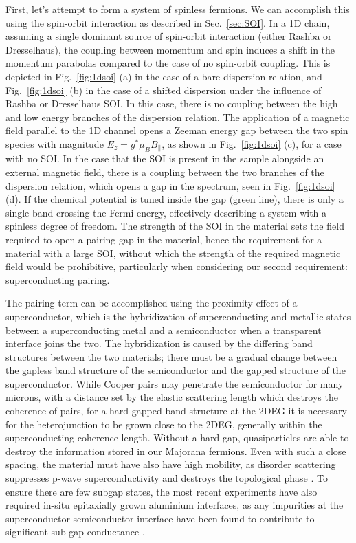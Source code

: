 First, let's attempt to form a system of spinless fermions. We can accomplish this using the spin-orbit interaction as described in
Sec.~\ref{sec:SOI}. In a 1D chain, assuming a single dominant source of spin-orbit interaction (either Rashba or Dresselhaus), the coupling between momentum
and spin induces a shift in the momentum parabolas compared to the case of no spin-orbit coupling. This is depicted in Fig.~\ref{fig:1dsoi} (a) in the case of a bare
dispersion relation, and Fig.~\ref{fig:1dsoi} (b) in the case of a shifted dispersion under the influence of Rashba or Dresselhaus SOI. In this case, there is
no coupling between the high and low energy branches of the dispersion relation. The application of a magnetic field parallel to the 1D channel opens a Zeeman energy
gap between the two spin species with magnitude $E_z = g^* \mu_B B_\parallel$, as shown in Fig.~\ref{fig:1dsoi} (c), for a case with no SOI. In the case that the
SOI is present in the sample alongside an external magnetic field, there is a coupling between the two branches of the dispersion relation, which opens a gap in the
spectrum, seen in Fig.~\ref{fig:1dsoi} (d). If the chemical
potential is tuned inside the gap (green line), there is only a single band crossing the Fermi energy, effectively describing a system with a spinless degree of freedom.
The strength of the SOI in the material sets the field required to open a pairing gap in the material, hence the requirement for a material with a large SOI, without
which the strength of the required magnetic field would be prohibitive, particularly when considering our second requirement: superconducting pairing.

The pairing term can be accomplished using the proximity effect of a superconductor, which is the hybridization of superconducting and metallic states
between a superconducting metal and a semiconductor when a transparent interface joins the two. The hybridization is caused by the differing band structures between
the two materials; there must be a gradual change between the gapless band structure of the semiconductor and the gapped structure of the superconductor.
While Cooper pairs may penetrate the semiconductor for many microns, with a distance set by the elastic scattering length which destroys the coherence
of pairs, for a hard-gapped band structure at the 2DEG it is necessary for the heterojunction to be grown close to the 2DEG, generally within the
superconducting coherence length. Without a hard gap, quasiparticles are able to destroy the information stored in our Majorana fermions. Even with such a close spacing,
the material must have also have high mobility, as disorder scattering suppresses p-wave superconductivity and destroys the topological phase \cite{PhysRevB.84.144526}.
To ensure there are few subgap states, the most recent experiments have also required in-situ epitaxially grown aluminium interfaces, as any impurities at the superconductor
semiconductor interface have been found to contribute to significant sub-gap conductance \cite{nnano.2014.306}.

